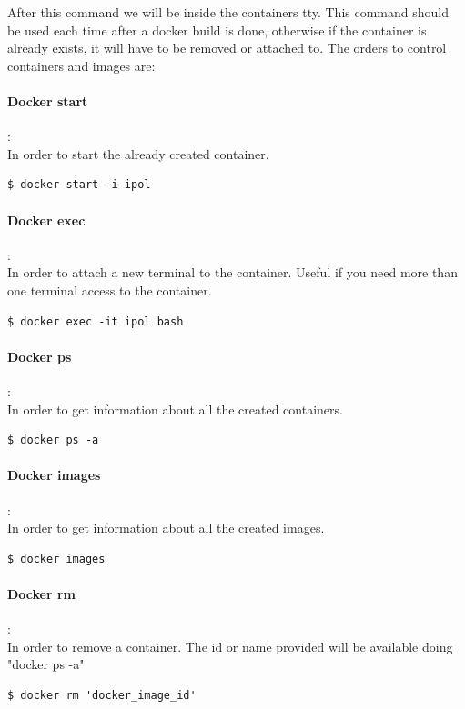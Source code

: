 \documentclass[a4paper,12pt]{article}
\begin{document}
After this command we will be inside the containers tty. This command should be used each time after a docker build is done,
otherwise if the container is already exists, it will have to be removed or attached to. The orders to control containers and images are:

\paragraph{Docker start}:\\
In order to start the already created container.
\begin{lstlisting}[firstnumber=1,breaklines]
  $ docker start -i ipol
\end{lstlisting}

\paragraph{Docker exec}:\\
In order to attach a new terminal to the container. Useful if you need more than one terminal access to the container.
\begin{lstlisting}[firstnumber=1,breaklines]
  $ docker exec -it ipol bash
\end{lstlisting}

\paragraph{Docker ps}:\\
In order to get information about all the created containers.
\begin{lstlisting}[firstnumber=1,breaklines]
  $ docker ps -a
\end{lstlisting}

\paragraph{Docker images}:\\
In order to get information about all the created images.
\begin{lstlisting}[firstnumber=1,breaklines]
  $ docker images
\end{lstlisting}

\paragraph{Docker rm}:\\
In order to remove a container. The id or name provided will be available doing "docker ps -a"
\begin{lstlisting}[firstnumber=1,breaklines]
  $ docker rm 'docker_image_id'
\end{lstlisting}
\end{document}
